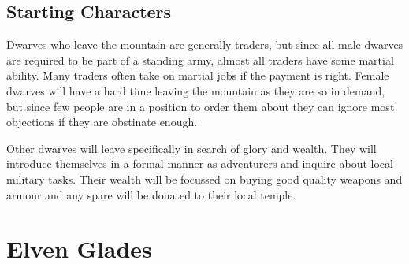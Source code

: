 \documentclass[titlepage,a4paper,openany]{book}
\begin{document}
\begin{multicols}{2}
\subsection{Starting Characters}\label{starting_characters}

Dwarves who leave the mountain are generally traders, but since all male dwarves are required to be part of a standing army, almost all traders have some martial ability. Many traders often take on martial jobs if the payment is right. Female dwarves will have a hard time leaving the mountain as they are so in demand, but since few people are in a position to order them about they can ignore most objections if they are obstinate enough.

Other dwarves will leave specifically in search of glory and wealth. They will introduce themselves in a formal manner as adventurers and inquire about local military tasks. Their wealth will be focussed on buying good quality weapons and armour and any spare will be donated to their local temple.

\end{multicols}

\section[Elves]{Elven Glades}
\end{document}
